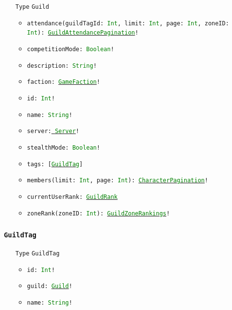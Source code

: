 \documentclass[10pt, a4paper]{memoir}
\numberwithin{equation}{section}
\theoremstyle{plain}
\theoremstyle{defp}
\theoremstyle{dotless}
\theoremstyle{definition}
\theoremstyle{dotless}
\theoremstyle{dotless}
\theoremstyle{defp}
\theoremstyle{defp}
\theoremstyle{be}          %
\theoremstyle{defp}
\newcommand\ttt[1]{\texttt{#1}}
\newcommand\type[1]{\ttt{\textcolor{green}{#1}}}
\begin{document}
\begin{itemize}[noitemsep,topsep=1pt]
	\item[\ttt{Type}] \ttt{Guild}
	\begin{itemize}[itemsep=1pt,topsep=1pt]
		\item \ttt{attendance(guildTagId: \type{Int}, limit: \type{Int}, page: \type{Int}, zoneID: \type{Int}): \hyperref[sec:guildattendancepagination]{\type{GuildAttendancePagination}}!}
		\item \ttt{competitionMode: \type{Boolean}!}
		\item \ttt{description: \type{String}!}
		\item \ttt{faction: \hyperref[sec:GameFaction]{\type{GameFaction}}!}
		\item \ttt{id: \type{Int}!}
		\item \ttt{name: \type{String}!}
		\item \ttt{server:\hyperref[sec:Server]{ \type{Server}}!}
		\item \ttt{stealthMode: \type{Boolean}!}
		\item \ttt{tags: [\hyperref[sec:GuildTag]{\type{GuildTag}}]}
		\item \ttt{members(limit: \type{Int}, page: \type{Int}): \hyperref[sec:characterpagination]{\type{CharacterPagination}}!}
		\item \ttt{currentUserRank: \hyperref[sec:GuildRank]{\type{GuildRank}}}
		\item \ttt{zoneRank(zoneID: \type{Int}): \hyperref[sec:GuildZoneRankings]{\type{GuildZoneRankings}}!}
	\end{itemize}
\end{itemize}

\subsubsection{\ttt{GuildTag}}\label{sec:GuildTag}

\begin{itemize}[noitemsep,topsep=1pt]
\item[\ttt{Type}] \ttt{GuildTag}
\begin{itemize}[itemsep=1pt,topsep=1pt]
\item \ttt{id: \type{Int}!}
\item \ttt{guild: \hyperref[sec:Guild]{\type{Guild}}!}
\item \ttt{name: \type{String}!}
\end{itemize}
\end{itemize}
\end{document}
